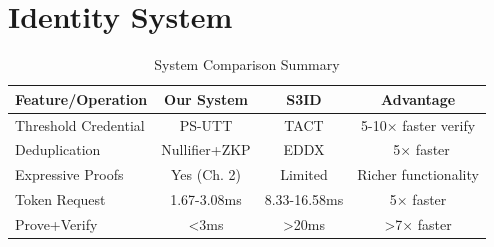 \section{Identity System}

\begin{table}[h]
\centering
\caption{System Comparison Summary}
\begin{tabular}{lccc}
\toprule
\textbf{Feature/Operation} & \textbf{Our System} & \textbf{S3ID} & \textbf{Advantage} \\
\midrule
Threshold Credential & PS-UTT & TACT & 5-10× faster verify \\
Deduplication & Nullifier+ZKP & EDDX & ~5× faster \\
Expressive Proofs & Yes (Ch. 2) & Limited & Richer functionality \\
Token Request & 1.67-3.08ms & 8.33-16.58ms & 5× faster \\
Prove+Verify & <3ms & >20ms & >7× faster \\
\bottomrule
\end{tabular}
\end{table}

